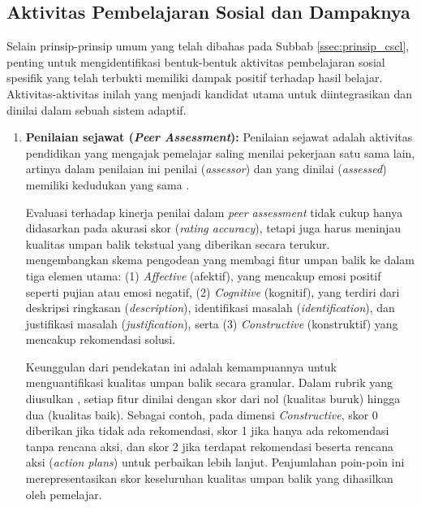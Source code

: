 \subsection{Aktivitas Pembelajaran Sosial dan Dampaknya}
\label{ssec:aktivitas_pembelajaran_sosial}
Selain prinsip-prinsip umum yang telah dibahas pada Subbab
\ref{ssec:prinsip_cscl}, penting untuk mengidentifikasi bentuk-bentuk aktivitas pembelajaran sosial spesifik yang telah terbukti memiliki dampak
positif terhadap hasil belajar. Aktivitas-aktivitas inilah yang menjadi kandidat
utama untuk diintegrasikan dan dinilai dalam sebuah sistem adaptif.

\begin{enumerate}
    \item \textbf{Penilaian sejawat (\textit{Peer Assessment}):}
    Penilaian sejawat adalah aktivitas pendidikan yang mengajak
    pemelajar saling menilai pekerjaan satu sama lain, artinya dalam
    penilaian ini penilai (\textit{assessor}) dan yang dinilai
    (\textit{assessed}) memiliki kedudukan yang sama
    \autocite{Ihichr2024}.
    
    Evaluasi terhadap kinerja penilai dalam
    \textit{peer assessment} tidak cukup hanya didasarkan
    pada akurasi skor (\textit{rating accuracy}), tetapi
    juga harus meninjau kualitas umpan balik tekstual yang
    diberikan secara terukur. \textcite{Kerman2024}
    mengembangkan skema pengodean yang membagi fitur umpan
    balik ke dalam tiga elemen utama: (1) \textit{Affective}
    (afektif), yang mencakup emosi positif seperti pujian
    atau emosi negatif, (2) \textit{Cognitive} (kognitif),
    yang terdiri dari deskripsi ringkasan (\textit{description}),
    identifikasi masalah (\textit{identification}), dan
    justifikasi masalah (\textit{justification}),
    serta (3) \textit{Constructive} (konstruktif)
    yang mencakup rekomendasi solusi.
    
    Keunggulan dari pendekatan ini adalah kemampuannya
    untuk menguantifikasi kualitas umpan balik secara
    granular. Dalam rubrik yang diusulkan
    \textcite{Kerman2024}, setiap fitur dinilai dengan
    skor dari nol (kualitas buruk) hingga dua (kualitas baik).
    Sebagai contoh, pada dimensi \textit{Constructive},
    skor 0 diberikan jika tidak ada rekomendasi, skor 1 jika
    hanya ada rekomendasi tanpa rencana aksi, dan skor 2 jika
    terdapat rekomendasi beserta rencana aksi (\textit{action
    plans}) untuk perbaikan lebih lanjut. Penjumlahan poin-poin
    ini merepresentasikan skor keseluruhan kualitas umpan
    balik yang dihasilkan oleh pemelajar.
    

\end{enumerate}
